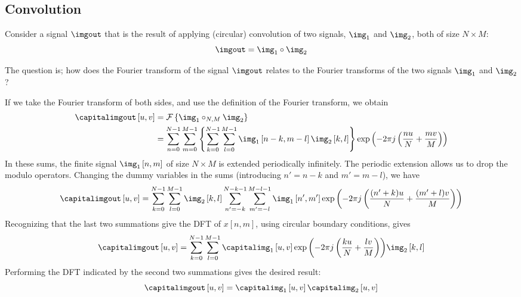 \subsection{Convolution}

Consider a signal $\imgout$ that is the result of applying (circular) convolution
of two signals, $\img_1$ and $\img_2$, both of size $N \times M$:
\begin{equation} 
\imgout = \img_1 \circ \img_2
\end{equation} 

The question is; how does the Fourier transform of the signal $\imgout$ relates to the Fourier transforms of the two signals $\img_1$ and $\img_2$?



If we take the Fourier transform of both sides, and use the
definition of the Fourier transform, we obtain
\begin{equation}
\begin{split}
\capitalimgout \left[u,v \right] & =  \mathcal{F}  \left\{ \img_1 \circ_{N,M} \img_2 \right\} \\
& =  
\sum_{n=0}^{N-1}  \sum_{m=0}^{M-1} 
\left\{
\sum_{k=0}^{N-1} \sum_{l=0}^{M-1} 
\img_1 \left[n-k, m-l \right] \img_2 \left[k,l \right]
\right\}
\exp \left(-2 \pi j \left(\frac{nu}{N} + \frac{mv}{M} \right) \right)
\end{split}
\end{equation}
In these sums, the finite signal $\img_1 \left[n, m \right]$ of size $N \times M$ is extended periodically infinitely. The periodic extension allows us to drop the modulo operators. Changing the dummy variables in the sums (introducing $n' = n - k$
and  $m' = m - l$), we have
\begin{equation}
\capitalimgout \left[u,v \right] =
\sum_{k=0}^{N-1} \sum_{l=0}^{M-1} 
\img_2 \left[k,l \right]
\sum_{n'=-k}^{N-k-1}  \sum_{m'=-l}^{M-l-1} 
\img_1 \left[n', m' \right] 
\exp{ \left(-2 \pi j \left(\frac{(n'+k)u}{N} + \frac{(m'+l)v}{M} \right) \right)}
\end{equation}
Recognizing that the last two summations give the DFT of $x\left[n,m\right]$, using
circular boundary conditions, gives
\begin{equation}
\capitalimgout \left[u,v \right] = \sum_{k=0}^{N-1} \sum_{l=0}^{M-1}  \capitalimg_1 \left[u,v\right] \exp{ \left(-2 \pi j \left(\frac{ku}{N}+\frac{lv}{M} \right ) \right)} \img_2 \left[k,l\right]
\end{equation}
Performing the DFT indicated by the second two summations gives the
desired result:
\begin{equation}
\capitalimgout \left[u,v\right] = \capitalimg_1 \left[u,v\right] \capitalimg_2 \left[u,v\right]
\end{equation}

